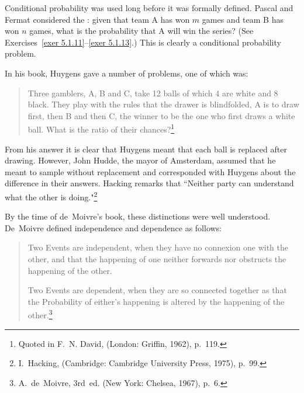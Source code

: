 Conditional probability was used long before it was formally defined.  Pascal and Fermat
considered the : given that team A has won $m$
games and team B has won $n$ games, what is the probability that A will win the series?  (See
Exercises~\ref{exer 5.1.11}--\ref{exer 5.1.13}.)  This is clearly a conditional probability
problem.  
\par
In his book,  Huygens gave a number of problems, one of which was:
\begin{quote}
\indent Three gamblers, A, B and C, take 12 balls of which 4 are white and 8
black.  They play with the rules that the drawer is blindfolded, A is to draw
first, then B and then C, the winner to be the one who first draws a white
ball.  What is the ratio of their chances?\footnote{Quoted in F.~N. David,
 (London: Griffin, 1962), p.~119.}
\end{quote}
\par
From his answer it is clear that Huygens meant that each ball is replaced after
drawing.  However, John Hudde, the mayor of Amsterdam, assumed that he meant to
sample without replacement and corresponded with Huygens about the difference
in their answers.  Hacking remarks that ``Neither party can understand what the
other is doing."\footnote{I.~Hacking, 
(Cambridge: Cambridge University Press, 1975), p.~99.}
\par
By the time of de~Moivre's book,  these
distinctions were well understood.  De~Moivre defined independence and
dependence as follows:
\begin{quote}
\indent Two Events are independent, when they have no connexion one with the
other, and that the happening of one neither forwards nor obstructs the
happening of the other.
\par
Two Events are dependent, when they are so connected together as that the
Probability of either's happening is altered by the happening of the
other.\footnote{A.~de~Moivre,  3rd~ed. (New York:
Chelsea, 1967), p.~6.}
\end{quote}


